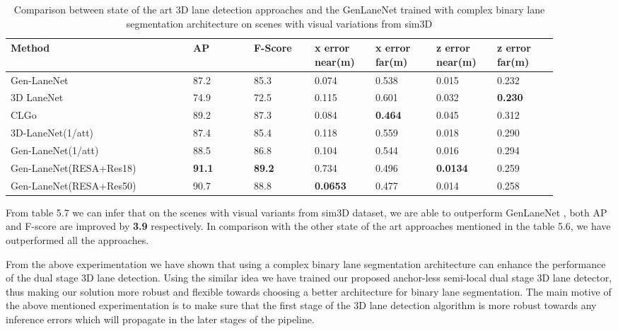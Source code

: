         \begin{table}[h]
    \centering
    \caption{Comparison between state of the art 3D lane detection approaches and the GenLaneNet \cite{Guo_2018_ECCV} trained with complex binary lane segmentation architecture on scenes with visual variations from sim3D \cite{}}
    \begin{tabular}{|p{0.3\linewidth}|p{0.1\linewidth}|p{0.1\linewidth}|p{0.1\linewidth}|p{0.1\linewidth}|p{0.1\linewidth}|p{0.1\linewidth}|}
    \hline
        \textbf{Method} & \textbf{AP} & \textbf{F-Score} & \textbf{x error near(m)} & \textbf{x error far(m)} & \textbf{z error near(m)} & \textbf{z error far(m)} \\ \hline
        Gen-LaneNet\cite{} & 87.2 & 85.3 & 0.074 & 0.538 & 0.015 & 0.232 \\ \hline
        3D LaneNet\cite{} & 74.9 & 72.5 & 0.115 & 0.601 & 0.032 & \textbf{0.230} \\ \hline
        CLGo \cite{}& 89.2 & 87.3 & 0.084 & \textbf{0.464} & 0.045 & 0.312 \\ \hline
        3D-LaneNet(1/att) \cite{} & 87.4 & 85.4 & 0.118 & 0.559 & 0.018 & 0.290 \\ \hline
        Gen-LaneNet(1/att) \cite{}& 88.5 & 86.8 & 0.104 & 0.544 & 0.016 & 0.294 \\ \hline
        Gen-LaneNet(RESA+Res18) & \textbf{ 91.1} &\textbf{ 89.2} & 0.734 & 0.496 & \textbf{0.0134} & 0.259 \\ \hline
        Gen-LaneNet(RESA+Res50) & 90.7 & 88.8 & \textbf{0.0653} & 0.477 & 0.014 & 0.258 \\ \hline
    \end{tabular}
\end{table}

 From table 5.7 we can infer that on the scenes with visual variants from sim3D dataset, we are able to outperform GenLaneNet \cite{guo2020gen}, both AP and F-score are improved by \textbf{3.9} respectively. In comparison with the other state of the art approaches mentioned in the table 5.6, we have outperformed all the approaches.
 
 From the above experimentation we have shown that using a complex binary lane segmentation architecture can enhance the performance of the dual stage 3D lane detection. Using the similar idea we have trained our proposed anchor-less semi-local dual stage 3D lane detector, thus making our solution more robust and flexible towards choosing a better architecture for binary lane segmentation. The main motive of the above mentioned experimentation is to make sure that the first stage of the 3D lane detection algorithm is more robust towards any inference errors which will propagate in the later stages of the pipeline. 

